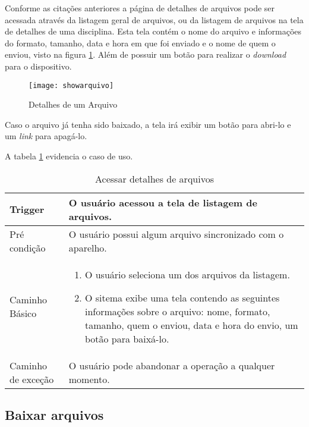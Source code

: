 Conforme as citações anteriores a página de detalhes de arquivos pode ser acessada através da listagem geral de arquivos, ou da listagem de arquivos na tela de detalhes de uma disciplina. Esta tela contém o nome do arquivo e informações do formato, tamanho, data e hora em que foi enviado e o nome de quem o enviou, visto na figura \ref{showarquivo}. Além de possuir um botão para realizar o \textit{download} para o dispositivo.  

\begin{figure}[H]
    \centering
\texttt{[image: showarquivo]}
    \caption{Detalhes de um Arquivo}
    \label{showarquivo}
\end{figure}

Caso o arquivo já tenha sido baixado, a tela irá exibir um botão para abri-lo e um \textit{link} para apagá-lo.

A tabela \ref{table:showarquivo} evidencia o caso de uso.

\begin{table}[H]
  \begin{tabular}{ p{} | p{} }
    Trigger & O usuário acessou a tela de listagem de arquivos.\\
    \hline
    Pré condição & O usuário possui algum arquivo sincronizado com o aparelho.\\
    \hline
    Caminho Básico &
    \begin{minipage}{5in}
      \vskip 4pt
      \begin{enumerate}
        \item O usuário seleciona um dos arquivos da listagem.
        \item O sitema exibe uma tela contendo as seguintes informações sobre o arquivo: nome, formato, tamanho, quem o enviou, data e hora do envio, um botão para baixá-lo.
      \end{enumerate}
      \vskip 4pt
    \end{minipage} \\
    \hline
    Caminho de exceção & O usuário pode abandonar a operação a qualquer momento.
  \end{tabular}
  \caption{Acessar detalhes de arquivos}
  \label{table:showarquivo}
\end{table}

\subsection{Baixar arquivos}

